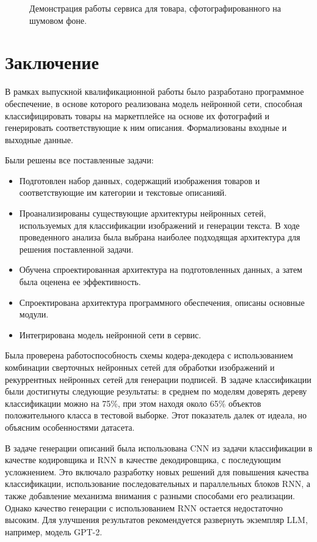 \documentclass[a4paper,12pt]{extarticle}
\begin{document}
\begin{figure}[ht]
	\caption{Демонстрация работы сервиса для товара, сфотографированного на шумовом фоне.}
	\label{fig:telegram-mirror-description}
\end{figure}

\newpage

\newpage
\section*{Заключение}

В рамках выпускной квалификационной работы было разработано программное обеспечение, в основе которого реализована модель нейронной сети, способная классифицировать товары на маркетплейсе на основе их фотографий и генерировать соответствующие к ним описания. Формализованы входные и выходные данные.

Были решены все поставленные задачи:
\begin{itemize}
	\item Подготовлен набор данных, содержащий изображения товаров и соответствующие им категории и текстовые описанияй.
	\item Проанализированы существующие архитектуры нейронных сетей, используемых для классификации изображений и генерации текста. В ходе проведенного анализа была выбрана наиболее подходящая архитектура для решения поставленной задачи.
	\item Обучена спроектированная архитектура на подготовленных данных, а затем была оценена ее эффективность.
	\item Спроектирована архитектура программного обеспечения, описаны основные модули.
	\item Интегрирована модель нейронной сети в сервис.
\end{itemize}

Была проверена работоспособность схемы кодера-декодера с использованием комбинации сверточных нейронных сетей для обработки изображений и рекуррентных нейронных сетей для генерации подписей. В задаче классификации были достигнуты следующие результаты: в среднем по моделям доверять дереву классификации можно на 75\%, при этом находя около 65\% объектов положительного класса в тестовой выборке. Этот показатель далек от идеала, но объясним особенностями датасета.

В задаче генерации описаний была использована CNN из задачи классификации в качестве кодировщика и RNN в качестве декодировщика, с последующим усложнением. Это включало разработку новых решений для повышения качества классификации, использование последовательных и параллельных блоков RNN, а также добавление механизма внимания с разными способами его реализации. Однако качество генерации с использованием RNN остается недостаточно высоким. Для улучшения результатов рекомендуется развернуть экземпляр LLM, например, модель GPT-2. 
\end{document}
